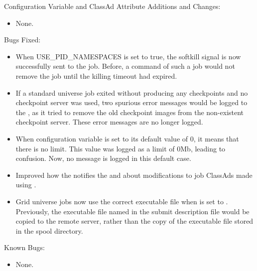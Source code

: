 \noindent Configuration Variable and ClassAd Attribute Additions and Changes:

\begin{itemize}

\item None.

\end{itemize}

\noindent Bugs Fixed:

\begin{itemize}

\item When USE\_PID\_NAMESPACES is set to true, the softkill
signal is now successfully sent to the job.  Before, a 
command of such a job would not remove the job until the
killing timeout had expired.

\item If a standard universe job exited without producing any
checkpoints and no checkpoint server was used, 
two spurious error messages would be logged to the ,
as it tried to remove the old checkpoint images from the
non-existent checkpoint server.  
These error messages are no longer logged.

\item When configuration variable  is set 
to its default value of 0, it means that there is no limit.  
This value was logged as a limit of 0Mb, leading to confusion.
Now, no message is logged in this default case.

\item Improved how the  notifies the 
and  about modifications to job ClassAds made using
.

\item Grid universe jobs now use the correct executable file when
 is set to .
Previously, the executable file named in the submit description file 
would be copied to the remote server, 
rather than the copy of the executable file stored in the spool directory.

\end{itemize}

\noindent Known Bugs:

\begin{itemize}

\item None.

\end{itemize}

